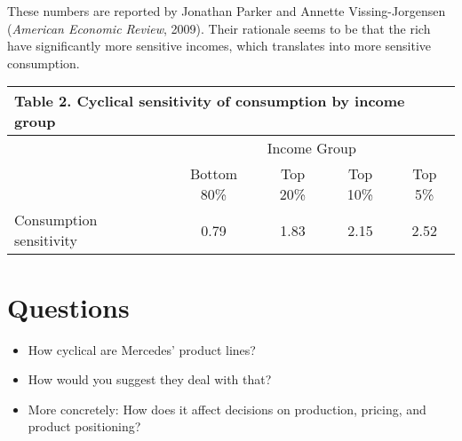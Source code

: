 \documentclass[letterpaper,12pt]{article}
\begin{document}
These numbers are reported by Jonathan Parker and Annette Vissing-Jorgensen
({\it American Economic Review\/}, 2009).
Their rationale seems to be that the rich have significantly more
sensitive incomes, which translates into more sensitive consumption.


\begin{center}
\tabcolsep=0.1in
\begin{tabular}{lcccc}
\multicolumn{5}{l}{Table 2.  Cyclical sensitivity of consumption by income group} \\
\toprule
    &  \multicolumn{4}{c}{Income Group} \\
        \cmidrule(r){2-5}
    &  Bottom 80\%  &  Top 20\% & Top 10\%  &  Top 5\%  \\
\midrule
Consumption sensitivity &  0.79 & 1.83 & 2.15 & 2.52 \\
\bottomrule
\end{tabular}
\end{center}

\section{Questions}

\begin{itemize}
\item How cyclical are Mercedes' product lines?

\item How would you suggest they deal with that?

\item More concretely:  How does it affect decisions on production,
pricing, and product positioning?
\end{itemize}


\end{document}
